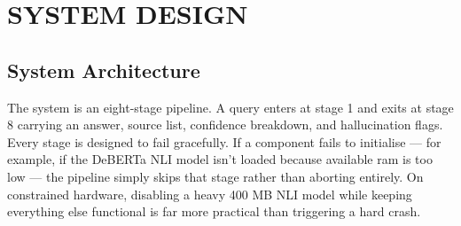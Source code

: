 \chapter{\MakeUppercase{System Design}}

\section{System Architecture}

The system is an eight-stage pipeline. A query enters at stage 1 and exits at stage 8 carrying an answer, source list, confidence breakdown, and hallucination flags. Every stage is designed to fail gracefully. If a component fails to initialise --- for example, if the DeBERTa NLI model isn't loaded because available \ac{ram} is too low --- the pipeline simply skips that stage rather than aborting entirely. On constrained hardware, disabling a heavy 400 MB NLI model while keeping everything else functional is far more practical than triggering a hard crash.

